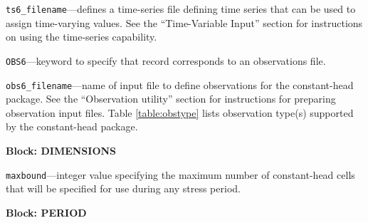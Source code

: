 \begin{description}
\item \texttt{ts6\_filename}---defines a time-series file defining time series that can be used to assign time-varying values. See the ``Time-Variable Input'' section for instructions on using the time-series capability.

\item \texttt{OBS6}---keyword to specify that record corresponds to an observations file.

\item \texttt{obs6\_filename}---name of input file to define observations for the constant-head package. See the ``Observation utility'' section for instructions for preparing observation input files. Table \ref{table:obstype} lists observation type(s) supported by the constant-head package.

\end{description}
\item \textbf{Block: DIMENSIONS}

\begin{description}
\item \texttt{maxbound}---integer value specifying the maximum number of constant-head cells that will be specified for use during any stress period.

\end{description}
\item \textbf{Block: PERIOD}

